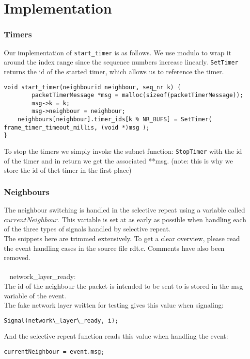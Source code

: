 \section{Implementation}
\subsubsection{Timers}
Our implementation of \texttt{start\_timer} is as follows.
We use modulo to wrap it around the index range since the sequence numbers increase linearly.
\texttt{SetTimer} returns the id of the started timer, which allows us to reference the timer.
\begin{lstlisting}
void start_timer(neighbourid neighbour, seq_nr k) {
        packetTimerMessage *msg = malloc(sizeof(packetTimerMessage));
        msg->k = k;
        msg->neighbour = neighbour;
	neighbours[neighbour].timer_ids[k % NR_BUFS] = SetTimer( frame_timer_timeout_millis, (void *)msg );
}
\end{lstlisting}
To stop the timers we simply invoke the subnet function: \texttt{StopTimer} with the id of the timer
and in return we get the associated **msg. (note: this is why we store the id of thet timer in the first place)
\subsubsection{Neighbours}
The neighbour switching is handled in the selective repeat using a variable called $currentNeighbour$. This variable is set at as early as possible when handling each of the three types of signals handled by selective repeat.\\
The snippets here are trimmed extensively. To get a clear overview, please read the event handling cases in the source file rdt.c. Comments have also been removed.\\
\\~
network\_layer\_ready:\\
The id of the neighbour the packet is intended to be sent to is stored in the msg variable of the event.\\
The fake network layer written for testing gives this value when signaling:
\begin{lstlisting}
Signal(network\_layer\_ready, i);
\end{lstlisting}
And the selective repeat function reads this value when handling the event:
\begin{lstlisting}
currentNeighbour = event.msg;
\end{lstlisting}

